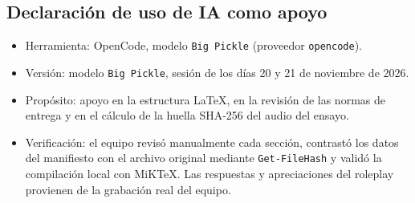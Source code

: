 \subsection{Declaraci\'on de uso de IA como apoyo}

\begin{itemize}
    \item Herramienta: OpenCode, modelo \texttt{Big Pickle} (proveedor \texttt{opencode}).
    \item Versi\'on: modelo \texttt{Big Pickle}, sesi\'on de los d\'ias 20 y 21 de noviembre de 2026.
    \item Prop\'osito: apoyo en la estructura \LaTeX{}, en la revisi\'on de las normas de entrega
          y en el c\'alculo de la huella SHA-256 del audio del ensayo.
    \item Verificaci\'on: el equipo revis\'o manualmente cada secci\'on, contrast\'o los datos del
          manifiesto con el archivo original mediante \texttt{Get-FileHash} y valid\'o la
          compilaci\'on local con MiKTeX. Las respuestas y apreciaciones del roleplay provienen
          de la grabaci\'on real del equipo.
\end{itemize}
